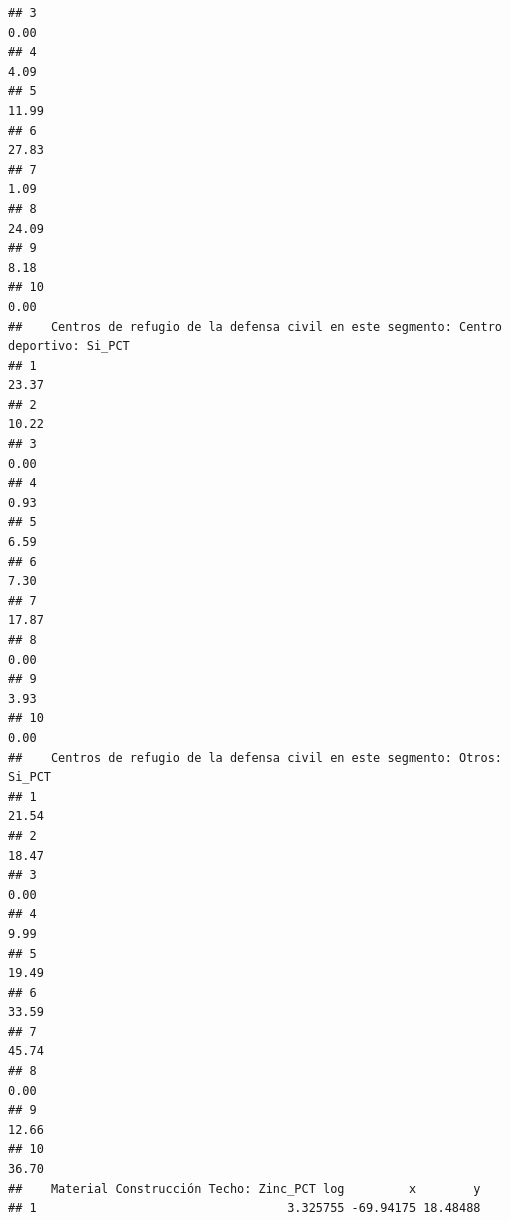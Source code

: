 \documentclass[11pt,]{article}
\begin{document}
\begin{verbatim}
## 3                                                                            0.00
## 4                                                                            4.09
## 5                                                                           11.99
## 6                                                                           27.83
## 7                                                                            1.09
## 8                                                                           24.09
## 9                                                                            8.18
## 10                                                                           0.00
##    Centros de refugio de la defensa civil en este segmento: Centro deportivo: Si_PCT
## 1                                                                              23.37
## 2                                                                              10.22
## 3                                                                               0.00
## 4                                                                               0.93
## 5                                                                               6.59
## 6                                                                               7.30
## 7                                                                              17.87
## 8                                                                               0.00
## 9                                                                               3.93
## 10                                                                              0.00
##    Centros de refugio de la defensa civil en este segmento: Otros: Si_PCT
## 1                                                                   21.54
## 2                                                                   18.47
## 3                                                                    0.00
## 4                                                                    9.99
## 5                                                                   19.49
## 6                                                                   33.59
## 7                                                                   45.74
## 8                                                                    0.00
## 9                                                                   12.66
## 10                                                                  36.70
##    Material Construcción Techo: Zinc_PCT log         x        y
## 1                                   3.325755 -69.94175 18.48488

\end{verbatim}
\end{document}
